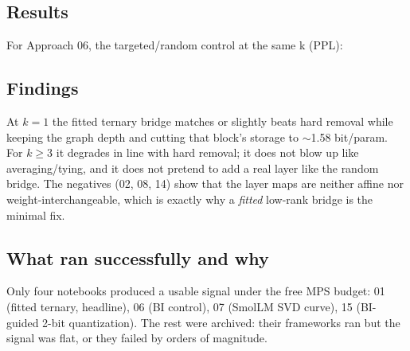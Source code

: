 \documentclass[11pt]{article}
\begin{document}
\subsection{Results}
\begin{table}[h]
\centering
\small
\small
{}
\normalsize
\caption{Validation PPL by number of replaced layers on the wikitext-2-raw-v1 3k-token window.}
\end{table}
\medskip

For Approach 06, the targeted/random control at the same k (PPL):
\small
\small
{}
\normalsize

\subsection{Findings}
At $k{=}1$ the fitted ternary bridge matches or slightly beats hard removal
while keeping the graph depth and cutting that block's storage to $\sim$1.58
bit/param. For $k\ge 3$ it degrades in line with hard removal; it does not
blow up like averaging/tying, and it does not pretend to add a real layer
like the random bridge. The negatives (02, 08, 14) show that the layer maps
are neither affine nor weight-interchangeable, which is exactly why a
\emph{fitted} low-rank bridge is the minimal fix.

\subsection{What ran successfully and why}
Only four notebooks produced a usable signal under the free MPS budget:
01 (fitted ternary, headline), 06 (BI control), 07 (SmolLM SVD curve), 15
(BI-guided 2-bit quantization). The rest were archived: their frameworks
ran but the signal was flat, or they failed by orders of magnitude.
\end{document}
